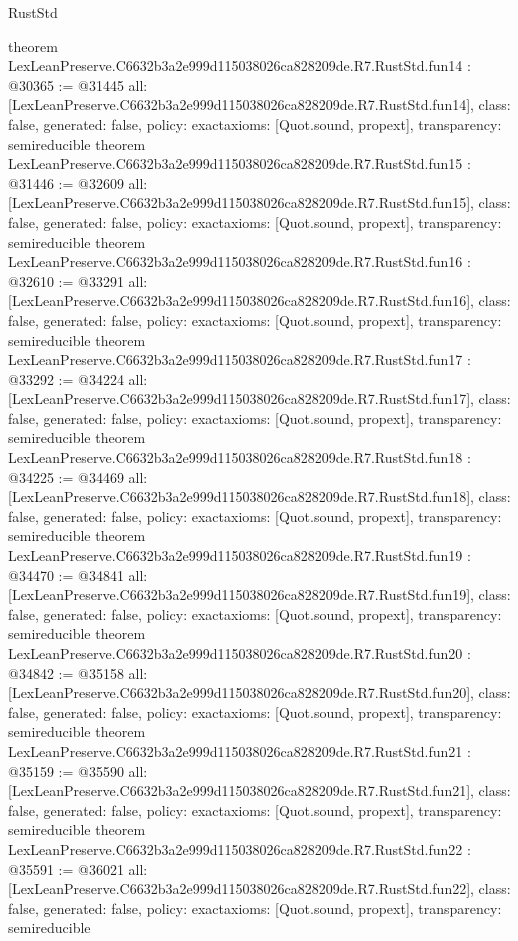\begin{lexlean}{RustStd}
\begin{coremodule}
{}
theorem LexLeanPreserve.C6632b3a2e999d115038026ca828209de.R7.RustStd.fun14 : @30365 := @31445 {
  all: [LexLeanPreserve.C6632b3a2e999d115038026ca828209de.R7.RustStd.fun14],
  class: false,
  generated: false,
  policy: exact{axioms: [Quot.sound, propext]},
  transparency: semireducible
}
theorem LexLeanPreserve.C6632b3a2e999d115038026ca828209de.R7.RustStd.fun15 : @31446 := @32609 {
  all: [LexLeanPreserve.C6632b3a2e999d115038026ca828209de.R7.RustStd.fun15],
  class: false,
  generated: false,
  policy: exact{axioms: [Quot.sound, propext]},
  transparency: semireducible
}
theorem LexLeanPreserve.C6632b3a2e999d115038026ca828209de.R7.RustStd.fun16 : @32610 := @33291 {
  all: [LexLeanPreserve.C6632b3a2e999d115038026ca828209de.R7.RustStd.fun16],
  class: false,
  generated: false,
  policy: exact{axioms: [Quot.sound, propext]},
  transparency: semireducible
}
theorem LexLeanPreserve.C6632b3a2e999d115038026ca828209de.R7.RustStd.fun17 : @33292 := @34224 {
  all: [LexLeanPreserve.C6632b3a2e999d115038026ca828209de.R7.RustStd.fun17],
  class: false,
  generated: false,
  policy: exact{axioms: [Quot.sound, propext]},
  transparency: semireducible
}
theorem LexLeanPreserve.C6632b3a2e999d115038026ca828209de.R7.RustStd.fun18 : @34225 := @34469 {
  all: [LexLeanPreserve.C6632b3a2e999d115038026ca828209de.R7.RustStd.fun18],
  class: false,
  generated: false,
  policy: exact{axioms: [Quot.sound, propext]},
  transparency: semireducible
}
theorem LexLeanPreserve.C6632b3a2e999d115038026ca828209de.R7.RustStd.fun19 : @34470 := @34841 {
  all: [LexLeanPreserve.C6632b3a2e999d115038026ca828209de.R7.RustStd.fun19],
  class: false,
  generated: false,
  policy: exact{axioms: [Quot.sound, propext]},
  transparency: semireducible
}
theorem LexLeanPreserve.C6632b3a2e999d115038026ca828209de.R7.RustStd.fun20 : @34842 := @35158 {
  all: [LexLeanPreserve.C6632b3a2e999d115038026ca828209de.R7.RustStd.fun20],
  class: false,
  generated: false,
  policy: exact{axioms: [Quot.sound, propext]},
  transparency: semireducible
}
theorem LexLeanPreserve.C6632b3a2e999d115038026ca828209de.R7.RustStd.fun21 : @35159 := @35590 {
  all: [LexLeanPreserve.C6632b3a2e999d115038026ca828209de.R7.RustStd.fun21],
  class: false,
  generated: false,
  policy: exact{axioms: [Quot.sound, propext]},
  transparency: semireducible
}
theorem LexLeanPreserve.C6632b3a2e999d115038026ca828209de.R7.RustStd.fun22 : @35591 := @36021 {
  all: [LexLeanPreserve.C6632b3a2e999d115038026ca828209de.R7.RustStd.fun22],
  class: false,
  generated: false,
  policy: exact{axioms: [Quot.sound, propext]},
  transparency: semireducible
}
\end{coremodule}
\end{lexlean}
